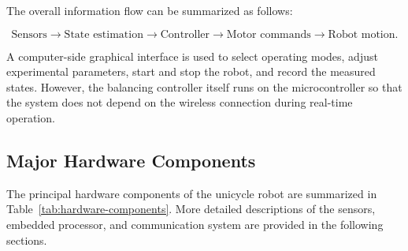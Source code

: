 The overall information flow can be summarized as follows:

\begin{equation}
\text{Sensors}
\longrightarrow
\text{State estimation}
\longrightarrow
\text{Controller}
\longrightarrow
\text{Motor commands}
\longrightarrow
\text{Robot motion}.
\label{eq:hardware-information-flow}
\end{equation}

A computer-side graphical interface is used to select operating modes, adjust experimental parameters, start and stop the robot, and record the measured states. However, the balancing controller itself runs on the microcontroller so that the system does not depend on the wireless connection during real-time operation.

%

\subsection{Major Hardware Components}

The principal hardware components of the unicycle robot are summarized in Table~\ref{tab:hardware-components}. More detailed descriptions of the sensors, embedded processor, and communication system are provided in the following sections.

